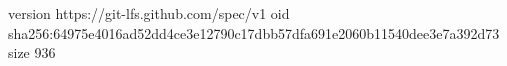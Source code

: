 version https://git-lfs.github.com/spec/v1
oid sha256:64975e4016ad52dd4ce3e12790c17dbb57dfa691e2060b11540dee3e7a392d73
size 936
